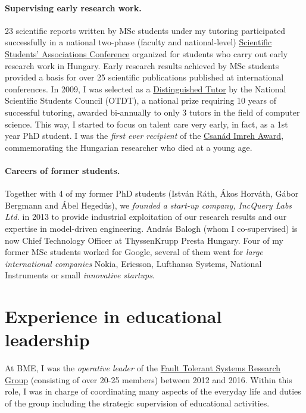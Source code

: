 \documentclass[a4paper,11pt]{article}
\begin{document}
\paragraph{Supervising early research work.} 
23 scientific reports written by MSc students under my tutoring participated successfully in a national two-phase (faculty and national-level) \href{http://www.otdt.hu/hu/cms/otdk/orszagos-tudomanyos-diakkori-konferencia/}{Scientific Students’ Associations Conference} organized for students who carry out early research work in Hungary. Early research results achieved by MSc students provided a basis for over 25 scientific publications published at international conferences. In 2009, I was selected as a \href{http://www.otdt.hu/page/kituntetesek/mak2009.php}{Distinguished Tutor} by the National Scientific Students Council (OTDT), a national prize requiring 10 years of successful tutoring, awarded bi-annually to only 3 tutors in the field of computer science. This way, I started to focus on talent care very early, in fact, as a 1st year PhD student. I was the \emph{first ever recipient} of the \href{https://otdk2017.mik.uni-pannon.hu/index.php/eredmenyek}{Csanád Imreh Award}, commemorating the Hungarian researcher who died %
at a young age. 

\paragraph{Careers of former students.} Together with 4 of my former PhD students (István Ráth, Ákos Horváth, Gábor Bergmann and Ábel Hegedüs), we \emph{founded a start-up company, IncQuery Labs Ltd.} in 2013 to provide industrial exploitation of our research results and our expertise in model-driven engineering. András Balogh (whom I co-supervised) is now Chief Technology Officer at ThyssenKrupp Presta Hungary. Four of my former MSc students worked for Google, several of them went for \emph{large international companies} Nokia, Ericsson, Lufthansa Systems, National Instruments or small \emph{innovative startups}.

\section{Experience in educational leadership}
At BME, I was the \emph{operative leader} of the \href{http://inf.mit.bme.hu/en/}{Fault Tolerant Systems Research Group} (consisting of over 20-25 members) between 2012 and 2016. Within this role, I was in charge of coordinating many aspects of the everyday life and duties of the group including the strategic supervision of educational activities. 
\end{document}
